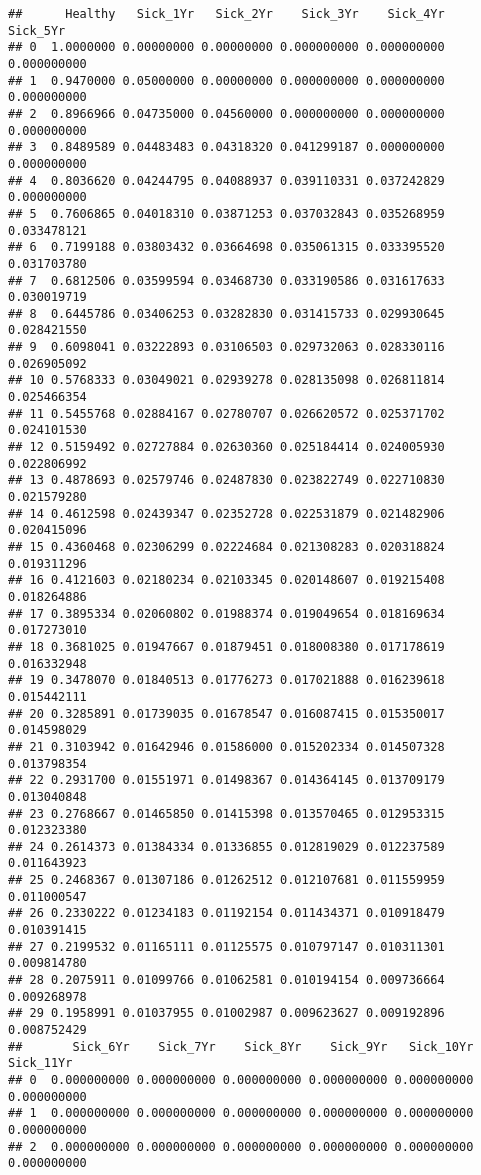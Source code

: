 \documentclass[
]{article}
\begin{document}
\begin{verbatim}
##      Healthy   Sick_1Yr   Sick_2Yr    Sick_3Yr    Sick_4Yr    Sick_5Yr
## 0  1.0000000 0.00000000 0.00000000 0.000000000 0.000000000 0.000000000
## 1  0.9470000 0.05000000 0.00000000 0.000000000 0.000000000 0.000000000
## 2  0.8966966 0.04735000 0.04560000 0.000000000 0.000000000 0.000000000
## 3  0.8489589 0.04483483 0.04318320 0.041299187 0.000000000 0.000000000
## 4  0.8036620 0.04244795 0.04088937 0.039110331 0.037242829 0.000000000
## 5  0.7606865 0.04018310 0.03871253 0.037032843 0.035268959 0.033478121
## 6  0.7199188 0.03803432 0.03664698 0.035061315 0.033395520 0.031703780
## 7  0.6812506 0.03599594 0.03468730 0.033190586 0.031617633 0.030019719
## 8  0.6445786 0.03406253 0.03282830 0.031415733 0.029930645 0.028421550
## 9  0.6098041 0.03222893 0.03106503 0.029732063 0.028330116 0.026905092
## 10 0.5768333 0.03049021 0.02939278 0.028135098 0.026811814 0.025466354
## 11 0.5455768 0.02884167 0.02780707 0.026620572 0.025371702 0.024101530
## 12 0.5159492 0.02727884 0.02630360 0.025184414 0.024005930 0.022806992
## 13 0.4878693 0.02579746 0.02487830 0.023822749 0.022710830 0.021579280
## 14 0.4612598 0.02439347 0.02352728 0.022531879 0.021482906 0.020415096
## 15 0.4360468 0.02306299 0.02224684 0.021308283 0.020318824 0.019311296
## 16 0.4121603 0.02180234 0.02103345 0.020148607 0.019215408 0.018264886
## 17 0.3895334 0.02060802 0.01988374 0.019049654 0.018169634 0.017273010
## 18 0.3681025 0.01947667 0.01879451 0.018008380 0.017178619 0.016332948
## 19 0.3478070 0.01840513 0.01776273 0.017021888 0.016239618 0.015442111
## 20 0.3285891 0.01739035 0.01678547 0.016087415 0.015350017 0.014598029
## 21 0.3103942 0.01642946 0.01586000 0.015202334 0.014507328 0.013798354
## 22 0.2931700 0.01551971 0.01498367 0.014364145 0.013709179 0.013040848
## 23 0.2768667 0.01465850 0.01415398 0.013570465 0.012953315 0.012323380
## 24 0.2614373 0.01384334 0.01336855 0.012819029 0.012237589 0.011643923
## 25 0.2468367 0.01307186 0.01262512 0.012107681 0.011559959 0.011000547
## 26 0.2330222 0.01234183 0.01192154 0.011434371 0.010918479 0.010391415
## 27 0.2199532 0.01165111 0.01125575 0.010797147 0.010311301 0.009814780
## 28 0.2075911 0.01099766 0.01062581 0.010194154 0.009736664 0.009268978
## 29 0.1958991 0.01037955 0.01002987 0.009623627 0.009192896 0.008752429
##       Sick_6Yr    Sick_7Yr    Sick_8Yr    Sick_9Yr   Sick_10Yr   Sick_11Yr
## 0  0.000000000 0.000000000 0.000000000 0.000000000 0.000000000 0.000000000
## 1  0.000000000 0.000000000 0.000000000 0.000000000 0.000000000 0.000000000
## 2  0.000000000 0.000000000 0.000000000 0.000000000 0.000000000 0.000000000

\end{verbatim}
\end{document}
